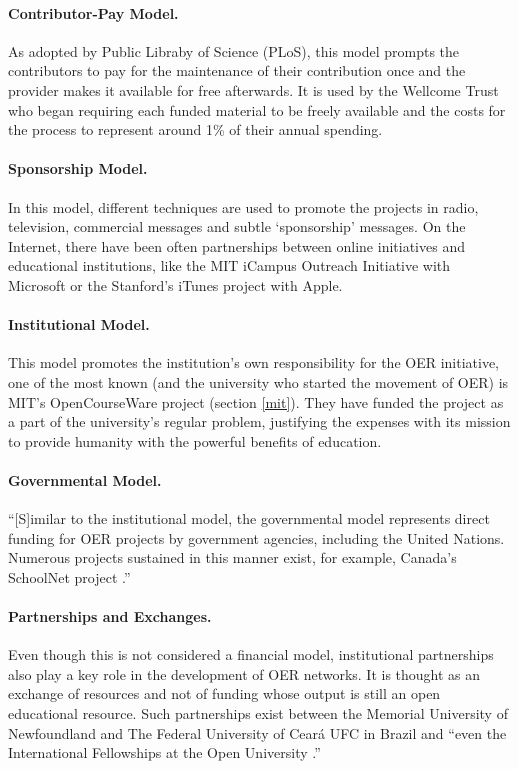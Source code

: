 \documentclass[a4paper]{article}
\begin{document}
\paragraph{Contributor-Pay Model.}
As adopted by Public Libraby of Science (PLoS), this model prompts the contributors to pay for the maintenance of their contribution once and the provider makes it available for free afterwards. It is used by the Wellcome Trust who began requiring each funded material to be freely available and the costs for the process to represent around 1\% of their annual spending.

\paragraph{Sponsorship Model.}
In this model, different techniques are used to promote the projects in radio, television, commercial messages and subtle `sponsorship' messages. On the Internet, there have been often partnerships between online initiatives and educational institutions, like the MIT iCampus Outreach Initiative with Microsoft or the Stanford's iTunes project with Apple. 

\paragraph{Institutional Model.}
This model promotes the institution's own responsibility for the OER initiative, one of the most known (and the university who started the movement of OER) is MIT's OpenCourseWare project (section \ref{mit}). They have funded the project as a part of the university's regular problem, justifying the expenses with its mission to provide humanity with the powerful benefits of education.

\paragraph{Governmental Model.}
``[S]imilar to the institutional model, the governmental model represents direct funding for OER projects by government agencies, including the United Nations. Numerous projects sustained in this manner exist, for example, Canada’s SchoolNet project \cite[p.35]{sustain}.''

\paragraph{Partnerships and Exchanges.}
Even though this is not considered a financial model, institutional partnerships also play a key role in the development of OER networks. It is thought as an exchange of resources and not of funding whose output is still an open educational resource. Such partnerships exist between the Memorial University of Newfoundland and The Federal University of Ceará UFC in Brazil and ``even the International Fellowships at the Open University \cite[p.36]{sustain}.''
\end{document}
